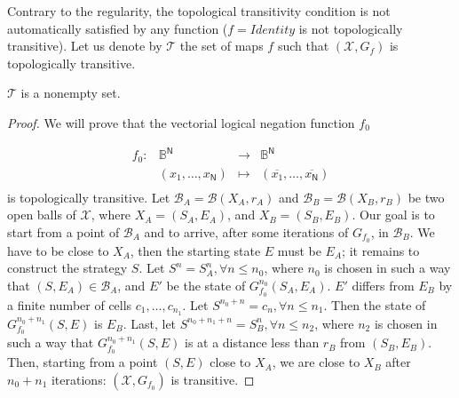 \label{transitivite} Contrary to the regularity, the topological
transitivity condition is not automatically satisfied by any function \newline ($
f=Identity$ is not topologically transitive). Let us denote by $\mathcal{T}$
the set of maps $f$ such that $(\mathcal{X},G_{f})$ is topologically
transitive.

\begin{theorem}
$\mathcal{T}$ is a nonempty set.
\end{theorem}

\begin{proof}
We will prove that the vectorial logical negation function $f_{0}$

\begin{equation}
\begin{array}{rccc}
f_{0}: & \mathds{B}^{\mathsf{N}} & \longrightarrow & \mathds{B}^{\mathsf{N}}
\\ 
& (x_{1},\hdots,x_{\mathsf{N}}) & \longmapsto & (\overline{x_{1}},\hdots,%
\overline{x_{\mathsf{N}}}) \\ 
&  &  & 
\end{array}
\label{f0}
\end{equation}%
\noindent is topologically transitive.\newline
Let $\mathcal{B}_A=\mathcal{B}(X_{A},r_{A})$ and $\mathcal{B}_B=\mathcal{B}(X_{B},r_{B})$ be two
open balls of $\mathcal{X}$, where $X_A=(S_A,E_A)$, and $X_B=(S_B,E_B)$. Our goal is to start from a point of $\mathcal{B}_A$ and to arrive, after some iterations of $G_{f_0}$, in $\mathcal{B}_B$.\newline
We have to be close to $X_{A}$, then the starting state $E$ must be $E_{A}$; it
remains to construct the strategy $S$. Let $S^n = S_{A}^n, \forall n \leqslant n_0$, where $n_0$ is chosen in such a way that $(S,E_{A})\in \mathcal{B}_{A}$, and $E'$ be the state of $G_{f_0}^{n_0}(S_{A},E_{A})$.\newline
$E'$ differs from $E_{B}$ by a finite number of cells $c_1,\hdots, c_{n_1}$. Let $S^{n_0+n} = c_n, \forall n \leqslant n_1$. Then the state of $G_{f_0}^{n_0+n_1}(S,E)$ is $E_{B}$.\newline
Last, let $S^{n_0+n_1+n} = S_{B}^n, \forall n \leqslant n_2$, where $n_2$ is chosen in such a way that $G_{f_0}^{n_0+n_1}(S,E)$ is at a distance less than $r_B $ from $(S_{B},E_{B})$. Then, starting from a point $(S,E)$ close to $X_A$, we are close to $X_B$ after $n_0+n_1$ iterations: $(\mathcal{X},G_{f_0})$ is transitive.
\end{proof}

